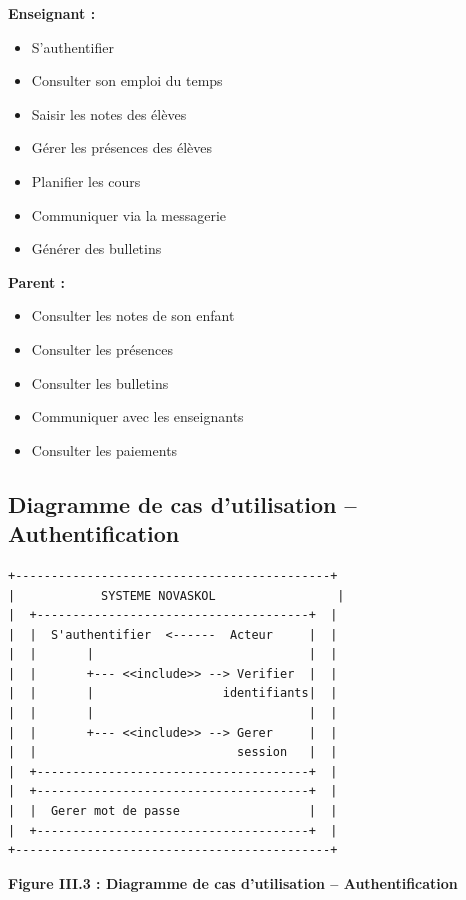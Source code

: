 \documentclass[12pt,a4paper,twoside]{report}
\begin{document}
\textbf{Enseignant :}
\begin{itemize}
    \item S'authentifier
    \item Consulter son emploi du temps
    \item Saisir les notes des élèves
    \item Gérer les présences des élèves
    \item Planifier les cours
    \item Communiquer via la messagerie
    \item Générer des bulletins
\end{itemize}

\textbf{Parent :}
\begin{itemize}
    \item Consulter les notes de son enfant
    \item Consulter les présences
    \item Consulter les bulletins
    \item Communiquer avec les enseignants
    \item Consulter les paiements
\end{itemize}

\subsection{Diagramme de cas d'utilisation -- Authentification}

\begin{verbatim}
+--------------------------------------------+
|            SYSTEME NOVASKOL                 |
|  +--------------------------------------+  |
|  |  S'authentifier  <------  Acteur     |  |
|  |       |                              |  |
|  |       +--- <<include>> --> Verifier  |  |
|  |       |                  identifiants|  |
|  |       |                              |  |
|  |       +--- <<include>> --> Gerer     |  |
|  |                            session   |  |
|  +--------------------------------------+  |
|  +--------------------------------------+  |
|  |  Gerer mot de passe                  |  |
|  +--------------------------------------+  |
+--------------------------------------------+
\end{verbatim}

\begin{center}
\textbf{Figure III.3 : Diagramme de cas d'utilisation -- Authentification}
\end{center}
\end{document}
